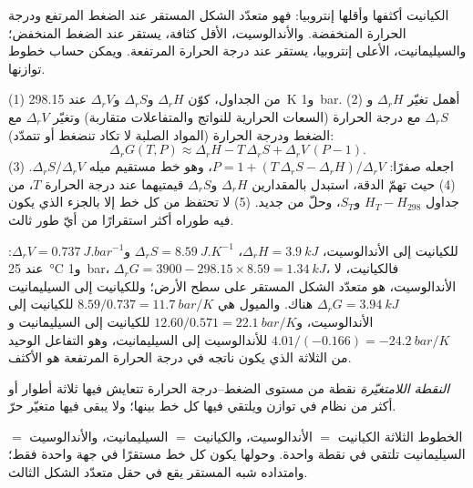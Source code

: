 الكيانيت أكثفها وأقلها إنتروبيا: فهو متعدّد الشكل المستقر عند الضغط المرتفع
ودرجة الحرارة المنخفضة. والأندالوسيت، الأقل كثافة، يستقر عند الضغط المنخفض؛ والسيليمانيت،
الأعلى إنتروبيا، يستقر عند درجة الحرارة المرتفعة. ويمكن حساب خطوط توازنها.

\begin{method}\label{met:b2:metamorphic-facies:line}
(1) من الجداول، كوّن $\Delta_r H$ و$\Delta_r S$ و$\Delta_r V$ عند \qty{298.15}{K}
و\qty{1}{bar}. (2) أهمل تغيّر $\Delta_r H$ و$\Delta_r S$ مع
درجة الحرارة (السعات الحرارية للنواتج والمتفاعلات متقاربة) وتغيّر $\Delta_r V$
مع الضغط ودرجة الحرارة (المواد الصلبة لا تكاد تنضغط أو تتمدّد):
\[
\Delta_r G(T, P) \approx \Delta_r H - T\,\Delta_r S + \Delta_r V\,(P - 1).
\]
(3) اجعله صفرًا: $P = 1 + (T\,\Delta_r S - \Delta_r H)/\Delta_r V$، وهو خط مستقيم
ميله $\Delta_r S/\Delta_r V$. (4) حيث تهمّ الدقة، استبدل بالمقدارين $\Delta_r H$
و$\Delta_r S$ قيمتيهما عند درجة الحرارة $T$، من جداول $H_T - H_{298}$ و$S_T$،
وحلّ من جديد. (5) لا تحتفظ من كل خط إلا بالجزء الذي يكون فيه طوراه أكثر استقرارًا
من أيّ طور ثالث.
\end{method}

للكيانيت إلى الأندالوسيت، $\Delta_r H = \qty{3.9}{kJ}$، $\Delta_r S =
\qty{8.59}{J.K^{-1}}$ و$\Delta_r V = \qty{0.737}{J.bar^{-1}}$: عند \qty{25}{\celsius}
و\qty{1}{bar}، $\Delta_r G = 3900 - 298.15\times8.59 = \qty{+1.34}{kJ}$، فالكيانيت،
لا الأندالوسيت، هو متعدّد الشكل المستقر على سطح الأرض؛ وللكيانيت إلى السيليمانيت
$\Delta_r G = \qty{+3.94}{kJ}$ هناك. والميول هي $8.59/0.737 = \qty{11.7}{bar/K}$
للكيانيت إلى الأندالوسيت، و$12.60/0.571 = \qty{22.1}{bar/K}$ للكيانيت إلى السيليمانيت
و$4.01/(-0.166) = \qty{-24.2}{bar/K}$ للأندالوسيت إلى السيليمانيت، وهو التفاعل الوحيد من
الثلاثة الذي يكون ناتجه في درجة الحرارة المرتفعة هو الأكثف.

\begin{definition}\label{def:b2:metamorphic-facies:invariant}
\emph{النقطة اللامتغيّرة} نقطة من
مستوى الضغط--درجة الحرارة تتعايش فيها ثلاثة أطوار أو أكثر من نظام في
توازن ويلتقي فيها كل خط  بينها؛ ولا يبقى فيها متغيّر حرّ.
\end{definition}

\begin{proposition}\label{prop:b2:metamorphic-facies:triple}
الخطوط الثلاثة الكيانيت $=$ الأندالوسيت، والكيانيت $=$ السيليمانيت، والأندالوسيت $=$
السيليمانيت تلتقي في نقطة واحدة. وحولها يكون كل خط مستقرًا في جهة واحدة فقط؛
وامتداده شبه المستقر يقع في حقل متعدّد الشكل الثالث.
\end{proposition}

